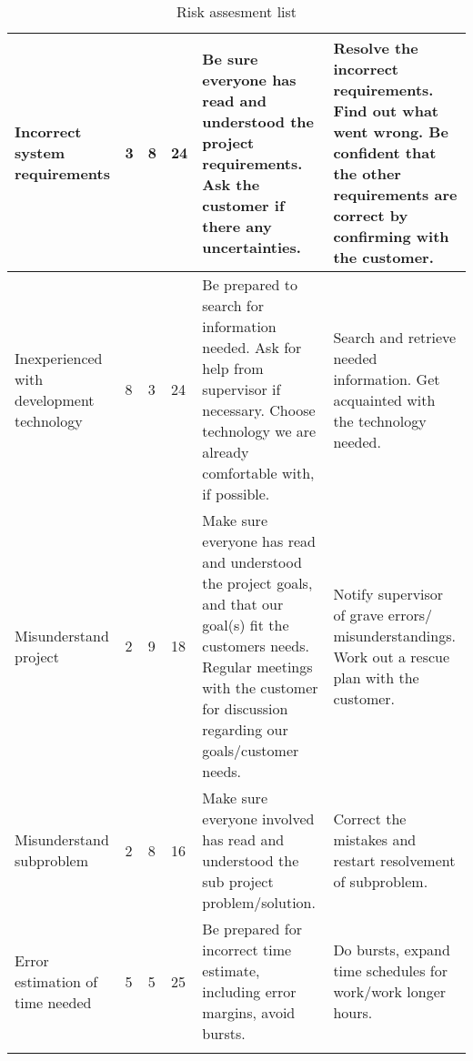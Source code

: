 {\begin{longtable}{| p{2.5cm} | p{2cm} | p{2cm} | p{2cm} | p{3cm} | p{3cm} |}
	Incorrect system requirements & 3 & 8 & 24 & Be sure everyone has read and 
		understood the project requirements. Ask the customer if there any 
		uncertainties. & Resolve the incorrect requirements. Find out what went 
		wrong. Be confident that the other requirements are correct by 
		confirming with the customer.
	\\\hline
	Inexperienced with development technology & 8 & 3 & 24 & Be prepared to 
		search for information needed. Ask for help from supervisor if 
		necessary. Choose technology we are already comfortable with, if 
		possible. & Search and retrieve needed information. Get acquainted with 
		the technology needed. 
	\\\hline
	Misunderstand project & 2 & 9 & 18 & Make sure everyone has read and 
		understood the project goals, and that our goal(s) fit the customers 
		needs. Regular meetings with the customer for discussion regarding our 
		goals/customer needs. & Notify supervisor of grave errors/
		misunderstandings. Work out a rescue plan with the customer. 
	\\\hline
	Misunderstand subproblem & 2 & 8 & 16 & Make sure everyone involved has 
		read and understood the sub project problem/solution. & Correct the 
		mistakes and restart resolvement of subproblem. 
	\\\hline
	Error estimation of time needed & 5 & 5 & 25 & Be prepared for incorrect 
		time estimate, including error margins, avoid bursts. & Do bursts, 
		expand time schedules for work/work longer hours. 
	\\\hline
\caption{Risk assesment list}
\label{fig:risklist}
\end{longtable}
}
